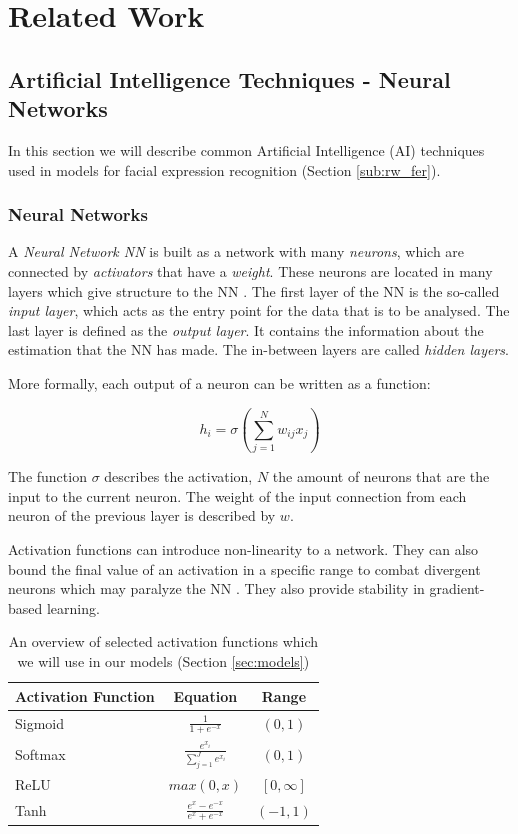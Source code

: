\section{Related Work}
\label{sec:related}
\subsection{Artificial Intelligence Techniques - Neural Networks}
\label{sub:aiml}
In this section we will describe common Artificial Intelligence (AI) techniques used in models for  facial expression recognition (Section \ref{sub:rw_fer}).
\subsubsection{Neural Networks}
A \emph{Neural Network NN} is built as a network with many \emph{neurons}, which are connected by \emph{activators} that have a \emph{weight}. These neurons are located in many layers which give structure to the NN \cite{schmidhuber2015deep}. The first layer of the NN is the so-called \emph{input layer}, which acts as the entry point for the data that is to be analysed. The last layer is defined as the \emph{output layer}. It contains the information about the estimation that the NN has made. The in-between layers are called \emph{hidden layers}.

More formally, each output of a neuron can be written as a function:

\begin{equation}
    h_i = \sigma (\sum_{j=1}^{N} w_{ij}x_{j})
\end{equation}

The function $\sigma$ describes the activation, $N$ the amount of neurons that are the input to the current neuron. The weight of the input connection from each neuron of the previous layer is described by $w$.

Activation functions can introduce non-linearity to a network. They can also bound the final value of an activation in a specific range to combat divergent neurons which may paralyze the NN \cite{wang2003artificial}. They also provide stability in gradient-based learning.
\bgroup
\def\arraystretch{2}
\begin{table}[]
    \centering
    \begin{tabular}{l|c|c}
        \textbf{Activation Function} & \textbf{Equation} & \textbf{Range} \\ \hline \hline
         Sigmoid & $\frac{1}{1 + e^{-x}}$ &  $(0,1)$\\\hline
         Softmax & $\frac{e^{x_i}}{\sum_{j=1}^{J} e^{x_i}}$ & $(0,1)$\\\hline
         ReLU & $max(0, x)$ & $[0, \infty]$ \\\hline
         Tanh & $\frac{e^x - e^{-x}}{e^x + e^{-x}}$ & $(-1, 1)$\\\hline
    \end{tabular}
    \caption{An overview of selected activation functions which we will use in our models (Section \ref{sec:models})}
    \label{tab:my_label}
\end{table}
\egroup

